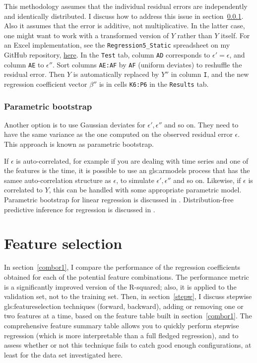 \documentclass[oneside,10pt]{book}
\begin{document}
This methodology assumes that the individual residual errors are independently and identically distributed. I discuss how to address this issue in 
section~\ref{rpb5}. Also it assumes that the error is additive, not multiplicative. In the latter case, one might want to work with a transformed version of $Y$ rather than $Y$ itself. For an Excel implementation, see the \texttt{Regression5\_Static} spreadsheet on my GitHub repository, \href{https://github.com/VincentGranville/Machine-Learning/blob/main/Spreadsheets/README.md}{here}. In the \texttt{Test} tab, column \texttt{AD} corresponds to $\epsilon'=\epsilon$, and column \texttt{AE} to $\epsilon''$. Sort columns \texttt{AE:AF} by \texttt{AF} (uniform deviates) to reshuffle the residual error.  Then $Y$ is automatically replaced by $Y''$ in 
column  \texttt{I}, and the new regression coefficient vector $\beta''$ is in cells \texttt{K6:P6} in the \texttt{Results} tab. 

\subsubsection{Parametric bootstrap}\label{rpb5}

Another option is to use Gaussian deviates for $\epsilon', \epsilon''$ and so on. They need to have the same variance as the one computed on the 
observed residual error $\epsilon$. This approach is known as \textcolor{index}{parametric bootstrap}. 

If $\epsilon$ is auto-correlated, for example if you are dealing with time series and one of the features is the time, it is possible to use an \gls{gls:armodels} process that has the samee auto-correlation structure as $\epsilon$, to simulate $\epsilon', \epsilon''$ and so on. Likewise, if $\epsilon$ is correlated to $Y$, this can be handled with some
appropriate parametric model. Parametric bootstrap for linear regression is discussed in \cite{parambr}. Distribution-free predictive inference for regression is discussed in \cite{predictrr}.


\section{Feature selection}

In section~\ref{combor1}, I compare the performance of the regression coefficients obtained for each of the potential feature combinations. The performance metric is a significantly improved version of  the R-squared; also, it is applied to the validation set, not to the training set. Then, in section~\ref{stepw}, I discuss stepwise \gls{gls:featureselection} techniques (forward, backward), 
adding or removing one or two features at a time, based on the feature table built in section~\ref{combor1}. The comprehensive feature summary table allows 
you to quickly perform stepwise regression (which is more interpretable than a full fledged regression), and to assess whether or not this technique fails to catch good enough configurations, at least for the data set investigated here.
\end{document}
